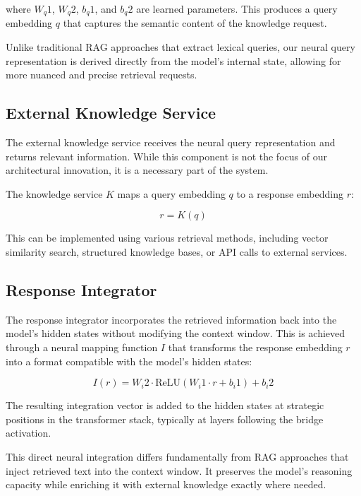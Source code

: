 \documentclass[9pt,a4paper,twocolumn,twoside]{tau-class/tau}
\begin{document}
    where $W_q1$, $W_q2$, $b_q1$, and $b_q2$ are learned parameters. This produces a query embedding $q$ that captures the semantic content of the knowledge request.

    Unlike traditional RAG approaches that extract lexical queries, our neural query representation is derived directly from the model's internal state, allowing for more nuanced and precise retrieval requests.

\subsection{External Knowledge Service}

    The external knowledge service receives the neural query representation and returns relevant information. While this component is not the focus of our architectural innovation, it is a necessary part of the system.

    The knowledge service $K$ maps a query embedding $q$ to a response embedding $r$:

    \begin{equation}
    r = K(q)
    \end{equation}

    This can be implemented using various retrieval methods, including vector similarity search, structured knowledge bases, or API calls to external services.

\subsection{Response Integrator}

    The response integrator incorporates the retrieved information back into the model's hidden states without modifying the context window. This is achieved through a neural mapping function $I$ that transforms the response embedding $r$ into a format compatible with the model's hidden states:

    \begin{equation}
    I(r) = W_i2 \cdot \text{ReLU}(W_i1 \cdot r + b_i1) + b_i2
    \end{equation}

    The resulting integration vector is added to the hidden states at strategic positions in the transformer stack, typically at layers following the bridge activation.

    This direct neural integration differs fundamentally from RAG approaches that inject retrieved text into the context window. It preserves the model's reasoning capacity while enriching it with external knowledge exactly where needed.
\end{document}
